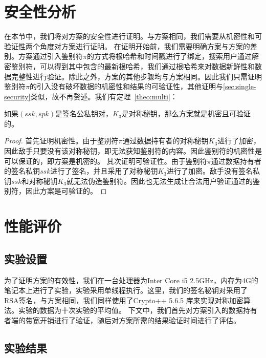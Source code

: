 \section{安全性分析}
在本节中，我们将对\multi 方案的安全性进行证明。与\single 方案相同，我们需要从机密性和可验证性两个角度对\multi 方案进行证明。
在证明开始前，我们需要明确\multi 方案与\single 方案的差别。\multi 方案通过引入鉴别符$\pi$的方式将根哈希和时间戳进行了绑定，搜索用户通过解密鉴别符，可以得到其中包含的最新根哈希，我们通过根哈希来对数据新鲜性和数据完整性进行验证。除此之外，\multi 方案的其他步骤均与\single 方案相同。因此我们只需证明鉴别符$\pi$的引入没有破坏数据的机密性和结果的可验证性，其他证明与\ref{sec:single-security}类似，故不再赘述。我们有定理~\ref{theo:multi}：
\begin{theorem}\label{theo:multi}
    如果$(ssk,spk)$是签名公私钥对，$K_3$是对称秘钥，那么\multi 方案就是机密且可验证的。
\end{theorem}

\begin{proof}
    首先证明机密性。由于鉴别符$\pi$通过数据持有者的对称秘钥$K_3$进行了加密，因此敌手只要没有该对称秘钥，即无法获知鉴别符的内容。因此鉴别符的机密性是可以保证的，即\multi 方案是机密的。
    其次证明可验证性。由于鉴别符$\pi$通过数据持有者的签名私钥$ssk$进行了签名，并且采用了对称秘钥$K_3$进行了加密。敌手没有签名私钥$ssk$和对称秘钥$K_3$就无法伪造鉴别符。因此也无法生成让合法用户验证通过的鉴别符，因此\multi 方案是可验证的。
\end{proof}

\section{性能评价}
\subsection{实验设置}
为了证明\multi 方案的有效性，我们在一台处理器为Inter Core i5 2.5GHz，内存为4G的笔记本上进行了实验，实验采用单线程执行。这里，我们的签名秘钥对采用了RSA签名，与\single 方案相同，我们同样使用了Crypto++ 5.6.5 库来实现对称加密算法。实验的数据为十次实验的平均值。
下文中，我们首先对\multi 方案引入的数据持有者端的带宽开销进行了验证，随后对\multi 方案所需的结果验证时间进行了评估。
\subsection{实验结果}
\label{sec:experiments}

